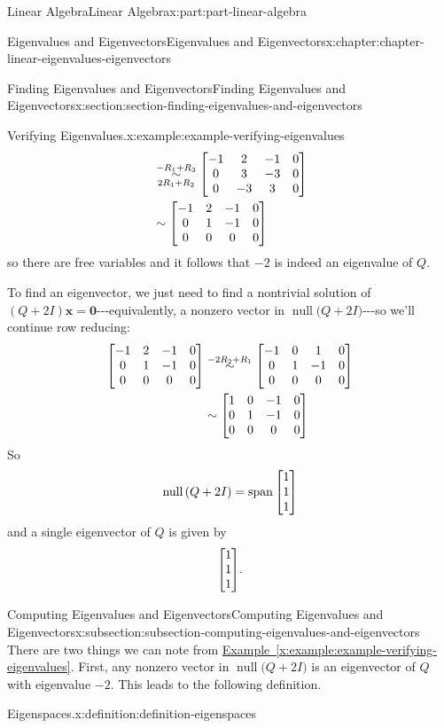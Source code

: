 \documentclass[twoside,10pt,]{book}
\newcommand{\xreffont}{\relax}
\numberwithin{equation}{part}
\providecommand{\vb}[1]{\mathbf{#1}}
\newcommand{\nul}[1]{\operatorname{null}{#1}}
\newcommand{\spn}[1]{\operatorname{span}{#1}}
\newcommand{\rowop}[2][]{\overset{#2}{\underset{#1}{\sim}}}
\begin{document}
\begin{partptx}{Linear Algebra}{}{Linear Algebra}{}{}{x:part:part-linear-algebra}
\begin{chapterptx}{Eigenvalues and Eigenvectors}{}{Eigenvalues and Eigenvectors}{}{}{x:chapter:chapter-linear-eigenvalues-eigenvectors}
\begin{sectionptx}{Finding Eigenvalues and Eigenvectors}{}{Finding Eigenvalues and Eigenvectors}{}{}{x:section:section-finding-eigenvalues-and-eigenvectors}
\begin{example}{Verifying Eigenvalues.}{x:example:example-verifying-eigenvalues}
\begin{align*}
&\rowop[2R_{1}+R_{2}]{-R_{1}+R_{3}}\mqty[-1 & 2 & -1 & 0 \\ 0 & 3 & -3 & 0 \\ 0 & -3 & 3 & 0]\\
&\sim\mqty[-1 & 2 & -1 & 0 \\ 0 & 1 & -1 & 0 \\ 0 & 0 & 0 & 0]
\end{align*}
so there are free variables and it follows that \(-2\) is indeed an eigenvalue of \(Q\).%
\par
To find an eigenvector, we just need to find a nontrivial solution of \((Q+2I)\vb{x} = \vb{0}\)-{}-{}-equivalently, a nonzero vector in \(\nul(Q+2I)\)-{}-{}-so we'll continue row reducing:%
\begin{align*}
\mqty[-1 & 2 & -1 & 0 \\ 0 & 1 & -1 & 0 \\ 0 & 0 & 0 & 0] &\rowop{-2R_{2}+R_{1}}\mqty[-1 & 0 & 1 & 0 \\ 0 & 1 & -1 & 0 \\ 0 & 0 & 0 & 0]\\
&\sim\mqty[1 & 0 & -1 & 0 \\ 0 & 1 & -1 & 0 \\ 0 & 0 & 0 & 0]
\end{align*}
So%
\begin{equation*}
\nul(Q+2I) = \spn{\mqty[1 \\ 1 \\ 1]}
\end{equation*}
and a single eigenvector of \(Q\) is given by%
\begin{equation*}
\mqty[1 \\ 1 \\ 1].
\end{equation*}
%
\end{example}
%
%
\typeout{************************************************}
\typeout{************************************************}
%
\begin{subsectionptx}{Computing Eigenvalues and Eigenvectors}{}{Computing Eigenvalues and Eigenvectors}{}{}{x:subsection:subsection-computing-eigenvalues-and-eigenvectors}
There are two things we can note from \hyperref[x:example:example-verifying-eigenvalues]{Example~{\xreffont\ref{x:example:example-verifying-eigenvalues}}}. First, any nonzero vector in \(\nul(Q+2I)\) is an eigenvector of \(Q\) with eigenvalue \(-2\). This leads to the following definition.%
\begin{definition}{Eigenspaces.}{x:definition:definition-eigenspaces}%

\end{definition}
\end{subsectionptx}
\end{sectionptx}
\end{chapterptx}
\end{partptx}
\end{document}
